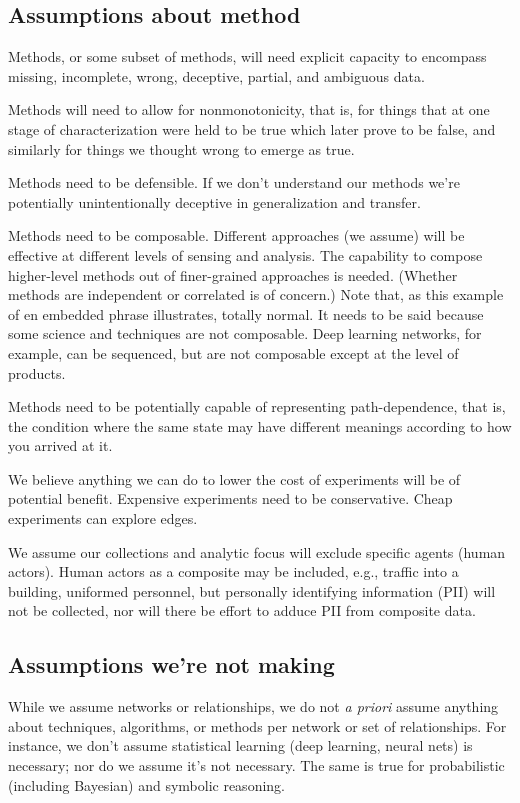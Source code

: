 \documentclass{article} %
\begin{document}
\subsection{Assumptions about method}
\begin{itemize*}
\item Methods, or some subset of methods, will need explicit capacity to encompass missing, incomplete, wrong, deceptive, partial, and ambiguous data. 
\item Methods will need to allow for nonmonotonicity, that is, for things that at one stage of characterization were held to be true which later prove to be false, and similarly for things we thought wrong to emerge as true.
\item Methods need to be defensible. If we don't understand our methods we're potentially unintentionally deceptive in generalization and transfer.
\item Methods need to be composable. Different approaches (we assume) will be effective at different levels of sensing and analysis. The capability to compose higher-level methods out of finer-grained approaches is needed. (Whether methods are independent or correlated is of concern.) Note that, as this example of en embedded phrase illustrates, totally normal. It needs to be said because some science and techniques are not composable. Deep learning networks, for example, can be sequenced, but are not composable except at the level of products.
\item Methods need to be potentially capable of representing path-dependence, that is, the condition where the same state may have different meanings according to how you arrived at it. 
\end{itemize*}

We believe anything we can do to lower the cost of experiments will be of potential benefit. Expensive experiments need to be conservative. Cheap experiments can explore edges. 

We assume our collections and analytic focus will exclude specific agents (human actors). Human actors as a composite may be included, e.g., traffic into a building, uniformed personnel, but personally identifying information (PII) will not be collected, nor will there be effort to adduce PII from composite data. 

\subsection{Assumptions we're not making}
While we assume networks or relationships, we do not \textit{a priori} assume anything about techniques, algorithms, or methods per network or set of relationships. For instance, we don't assume statistical learning (deep learning, neural nets) is necessary; nor do we assume it's not necessary. The same is true for probabilistic (including Bayesian) and symbolic reasoning. 
\end{document}
